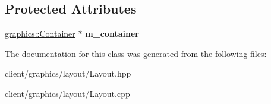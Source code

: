 \subsection*{Protected Attributes}
\begin{DoxyCompactItemize}
\item 
\hypertarget{classgraphics_1_1_layout_a323c5ab78eaf9693133c120bb283553c}{\hyperlink{classgraphics_1_1_container}{graphics\-::\-Container} $\ast$ {\bfseries m\-\_\-container}}\label{classgraphics_1_1_layout_a323c5ab78eaf9693133c120bb283553c}

\end{DoxyCompactItemize}


The documentation for this class was generated from the following files\-:\begin{DoxyCompactItemize}
\item 
client/graphics/layout/Layout.\-hpp\item 
client/graphics/layout/Layout.\-cpp\end{DoxyCompactItemize}
